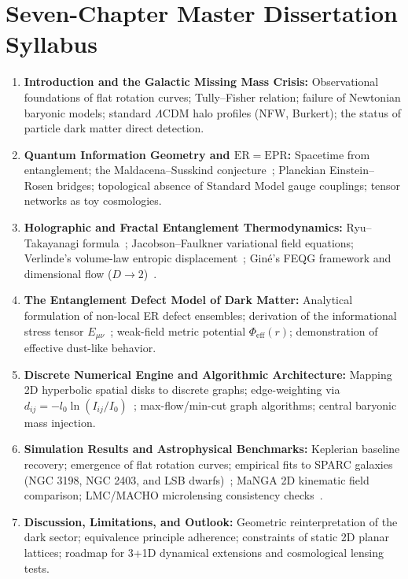 \documentclass[10pt,a4paper]{article}
\begin{document}
\section{Seven-Chapter Master Dissertation Syllabus}
\label{sec:syllabus}

\begin{enumerate}\setlength{\itemsep}{2pt}
    \item \textbf{Introduction and the Galactic Missing Mass Crisis:} Observational foundations of flat rotation curves; Tully--Fisher relation; failure of Newtonian baryonic models; standard $\Lambda\mathrm{CDM}$ halo profiles (NFW, Burkert); the status of particle dark matter direct detection.
    \item \textbf{Quantum Information Geometry and $\mathrm{ER}=\mathrm{EPR}$:} Spacetime from entanglement; the Maldacena--Susskind conjecture~\cite{maldacena2013}; Planckian Einstein--Rosen bridges; topological absence of Standard Model gauge couplings; tensor networks as toy cosmologies.
    \item \textbf{Holographic and Fractal Entanglement Thermodynamics:} Ryu--Takayanagi formula~\cite{ryu2006}; Jacobson--Faulkner variational field equations; Verlinde's volume-law entropic displacement~\cite{verlinde2016}; Gin\'e's FEQG framework and dimensional flow ($D \to 2$)~\cite{gine2026}.
    \item \textbf{The Entanglement Defect Model of Dark Matter:} Analytical formulation of non-local ER defect ensembles; derivation of the informational stress tensor $E_{\mu\nu}$~\cite{gine2026}; weak-field metric potential $\Phi_{\text{eff}}(r)$; demonstration of effective dust-like behavior.
    \item \textbf{Discrete Numerical Engine and Algorithmic Architecture:} Mapping 2D hyperbolic spatial disks to discrete graphs; edge-weighting via $d_{ij} = -l_0 \ln(I_{ij}/I_0)$~\cite{gine2026}; max-flow/min-cut graph algorithms; central baryonic mass injection.
    \item \textbf{Simulation Results and Astrophysical Benchmarks:} Keplerian baseline recovery; emergence of flat rotation curves; empirical fits to SPARC galaxies (NGC 3198, NGC 2403, and LSB dwarfs)~\cite{sparc2016}; MaNGA 2D kinematic field comparison; LMC/MACHO microlensing consistency checks~\cite{macho2001}.
    \item \textbf{Discussion, Limitations, and Outlook:} Geometric reinterpretation of the dark sector; equivalence principle adherence; constraints of static 2D planar lattices; roadmap for 3+1D dynamical extensions and cosmological lensing tests.
\end{enumerate}
\end{document}
